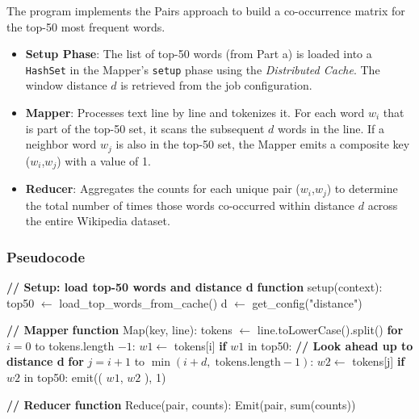 \documentclass[12pt,a4paper]{article}
\begin{document}
The program implements the Pairs approach to build a co-occurrence matrix for the top-50 most frequent words.

\begin{itemize}
    \item \textbf{Setup Phase}: The list of top-50 words (from Part a) is loaded into a \texttt{HashSet} in the Mapper's \texttt{setup} phase using the \textit{Distributed Cache}. The window distance $d$ is retrieved from the job configuration.
    \item \textbf{Mapper}: Processes text line by line and tokenizes it. For each word $w_i$ that is part of the top-50 set, it scans the subsequent $d$ words in the line. If a neighbor word $w_j$ is also in the top-50 set, the Mapper emits a composite key  ($w_i$,$w_j$) with a value of 1.
    \item \textbf{Reducer}: Aggregates the counts for each unique pair  ($w_i$,$w_j$) to determine the total number of times those words co-occurred within distance $d$ across the entire Wikipedia dataset.
\end{itemize}
\subsubsection{Pseudocode}

\begin{algorithm}
\caption{Co-occurring Word Matrix --- Pairs Approach}
\begin{algorithmic}[1]

\State \textbf{// Setup: load top-50 words and distance d}
\State \textbf{function} setup(context):
\State \quad top50 $\gets$ load\_top\_words\_from\_cache()
\State \quad d $\gets$ get\_config("distance")

\vspace{0.5em}
\State \textbf{// Mapper}
\State \textbf{function} Map(key, line):
\State \quad tokens $\gets$ line.toLowerCase().split()
\State \quad \textbf{for} $i = 0$ to tokens.length $- 1$:
\State \qquad $w1 \gets$ tokens[i]
\State \qquad \textbf{if} $w1$ in top50:
\State \qquad\quad \textbf{// Look ahead up to distance d}
\State \qquad\quad \textbf{for} $j = i + 1$ to $\min(i + d,\; \text{tokens.length} - 1)$:
\State \qquad\qquad $w2 \gets$ tokens[j]
\State \qquad\qquad \textbf{if} $w2$ in top50:
\State \qquad\qquad\quad emit(( $w1$, $w2$ ), 1)

\vspace{0.5em}
\State \textbf{// Reducer}
\State \textbf{function} Reduce(pair, counts):
\State \quad Emit(pair, sum(counts))

\end{algorithmic}
\end{algorithm}
\end{document}
